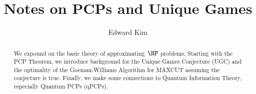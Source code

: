 \documentclass{amsart}
\theoremstyle{definition}
\theoremstyle{remark}
\numberwithin{equation}{section}
\theoremstyle{remark}
\begin{document}
\title{Notes on PCPs and Unique Games}

\author{Edward Kim}

\begin{abstract}
We expound on the basic theory of approximating $\NP$ problems. Starting with the PCP Theorem, we introduce background for the Unique Games Conjecture (UGC) and the optimality of the Goeman-Williams Algorithm for MAXCUT assuming the conjecture is true. Finally, we make some connections to Quantum Information Theory, especially Quantum PCPs (qPCPs).
\end{abstract}

\maketitle



\end{document}
